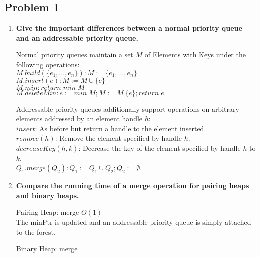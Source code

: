 \subsection{Problem 1}

\begin{enumerate}
    \item \textbf{Give the important differences between a normal priority queue and an addressable priority queue.}
    
    Normal priority queues maintain a set $M$ of Elements with Keys under the following operations: \\
    $M.build(\{e_1,...,e_n\}): M :=\{e_1,...,e_n\}$ \\
    $M.insert(e): M := M \cup \{e\}$ \\
    $M.min: return \; min \; M$ \\
    $M.deleteMin: e:=min \; M; M :=M \ \{e\}; return \; e$

    Addressable priority queues additionally support operations on arbitrary elements addressed by an element handle $h$: \\
    $insert$: As before but return a handle to the element inserted. \\
    $remove(h)$: Remove the element specified by handle $h$. \\
    $decreaseKey(h,k)$: Decrease the key of the element specified by handle $h$ to $k$. \\
    $Q_1.merge(Q_2): Q_1:= Q_1 \cup Q_2; Q_2 := \emptyset$.

    \item \textbf{Compare the running time of a merge operation for pairing heaps and binary heaps.}
    
    Pairing Heap: merge $O(1)$ \\
    The minPtr is updated and an addressable priority queue is simply attached to the forest.
    
    Binary Heap: merge
    
    

\end{enumerate}

